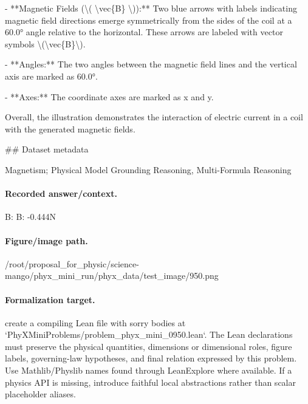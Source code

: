 - **Magnetic Fields (\textbackslash{}( \textbackslash{}vec\{B\} \textbackslash{})):** Two blue arrows with labels indicating magnetic field directions emerge symmetrically from the sides of the coil at a 60.0° angle relative to the horizontal. These arrows are labeled with vector symbols \textbackslash{}(\textbackslash{}vec\{B\}\textbackslash{}).

- **Angles:** The two angles between the magnetic field lines and the vertical axis are marked as 60.0°.

- **Axes:** The coordinate axes are marked as x and y.

Overall, the illustration demonstrates the interaction of electric current in a coil with the generated magnetic fields.

\#\# Dataset metadata

Magnetism; Physical Model Grounding Reasoning, Multi-Formula Reasoning

\paragraph{Recorded answer/context.}
B: B: -0.444N

\paragraph{Figure/image path.}
/root/proposal\_for\_physic/science-mango/phyx\_mini\_run/phyx\_data/test\_image/950.png

\paragraph{Formalization target.}
create a compiling Lean file with sorry bodies at `PhyXMiniProblems/problem\_phyx\_mini\_0950.lean`. The Lean declarations must preserve the physical quantities, dimensions or dimensional roles, figure labels, governing-law hypotheses, and final relation expressed by this problem.
Use Mathlib/Physlib names found through LeanExplore where available. If a physics API is missing, introduce faithful local abstractions rather than scalar placeholder aliases.

